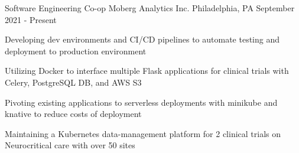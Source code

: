 

\begin{cventries}

  
	\cventry
	{Software Engineering Co-op}
	{Moberg Analytics Inc.}
	{Philadelphia, PA}
	{September 2021 - Present}
	{\begin{cvitems}
		\item {Developing dev environments and CI/CD pipelines to automate testing and deployment to production environment}
		\item {Utilizing Docker to interface multiple Flask applications for clinical trials with Celery, PostgreSQL DB, and AWS S3}
		\item {Pivoting existing applications to serverless deployments with minikube and knative to reduce costs of deployment}
		\item {Maintaining a Kubernetes data-management platform for 2 clinical trials on Neurocritical care with over 50 sites}
		\end{cvitems}}
	


\end{cventries}

